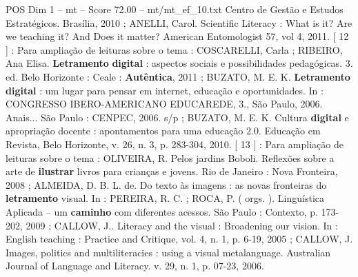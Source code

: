 \begin{textsample}{POS Dim 1 – mt – Score 72.00 – mt/mt\_ef\_10.txt}
Centro de Gestão e Estudos Estratégicos.
Brasília, 2010 ; ANELLI, Carol.
Scientific Literacy : What is it?
Are we teaching it?
And Does it matter?
American Entomologist 57, vol 4, 2011. [ 12 ] : Para ampliação de leituras sobre o tema : COSCARELLI, Carla ; RIBEIRO, Ana Elisa. \textbf{Letramento} \textbf{digital} : aspectos sociais e possibilidades pedagógicas. 3. ed.
Belo Horizonte : Ceale : \textbf{Autêntica}, 2011 ; BUZATO, M.
E.
K. \textbf{Letramento} \textbf{digital} : um lugar para pensar em internet, educação e oportunidades.
In : CONGRESSO IBERO-AMERICANO EDUCAREDE, 3., São Paulo, 2006.
Anais...
São Paulo : CENPEC, 2006. s/p ; BUZATO, M.
E.
K.
Cultura \textbf{digital} e apropriação docente : apontamentos para uma educação 2.0.
Educação em Revista, Belo Horizonte, v. 26, n. 3, p. 283-304, 2010. [ 13 ] : Para ampliação de leituras sobre o tema : OLIVEIRA, R.
Pelos jardins Boboli.
Reflexões sobre a arte de \textbf{ilustrar} livros para crianças e jovens.
Rio de Janeiro : Nova Fronteira, 2008 ; ALMEIDA, D.
B.
L. de.
Do texto às imagens : as novas fronteiras do \textbf{letramento} visual.
In : PEREIRA, R.
C. ; ROCA, P. ( orgs. ).
Linguística Aplicada – um \textbf{caminho} com diferentes acessos.
São Paulo : Contexto, p. 173-202, 2009 ; CALLOW, J..
Literacy and the visual : Broadening our vision.
In : English teaching : Practice and Critique, vol. 4, n. 1, p. 6-19, 2005 ; CALLOW, J.
Images, politics and multiliteracies : using a visual metalanguage.
Australian Journal of Language and Literacy. v. 29, n. 1, p. 07-23, 2006.

\end{textsample}
